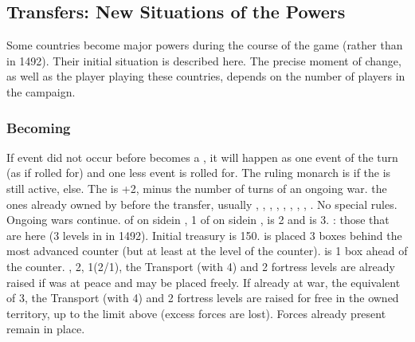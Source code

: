 \subsection{Transfers: New Situations of the Powers}
\aparag Some countries become major powers during the course of the game
(rather than in 1492). Their initial situation is described here.
\bparag The precise moment of change, as well as the player playing these
countries, depends on the number of players in the campaign.

\subsubsection{Becoming \paysmajeurSuede}
\aparag If event  did not occur before \SUE becomes a
\MAJ, it will happen as one event of the turn (as if rolled for) and one less
event is rolled for.
 The ruling monarch is  if the
 is still active,  else. The \STAB
is +2, minus the number of turns of an ongoing war.
 the ones already owned by \MIN \payssuede before the
transfer, usually \provinceSmaland, \provinceJamtland, \provinceGastrikland,
\provinceBergslagen, \provinceSvealand, \provinceFinland, \provinceTavastland,
\provinceNyland, \provinceKarelen.
 No special rules. Ongoing wars continue.
\MNU of  on side\faceplus in \provinceSvealand, 1 \MNU of
 on side\facemoins in \provinceJamtland, \FTI is 2 and \DTI is
3. \TradeFLEET: those that are here (3 levels in \seazoneBaltique in 1492).
\bparag Initial treasury is 150\ducats.
\aparag[Military]
\bparag {} is placed 3 boxes behind the most advanced
counter (but at least at the level of the  counter).  is 1 box ahead of the  counter.
\ARMY\faceplus, 2\LD, 1\FLEET\facemoins (2\NWD/1\NTD), the Transport
\FLEET\faceplus (with 4\NTD) and 2 fortress levels are already raised if
\payssuede was at peace and may be placed freely. If already at war, the
equivalent of 3\LD, the Transport \FLEET\faceplus (with 4\NTD) and 2 fortress
levels are raised for free in the owned territory, up to the limit above
(excess forces are lost). Forces already present remain in place.


